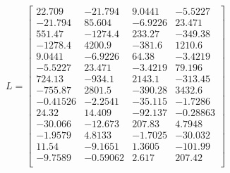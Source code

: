 {\small
\[
L=\begin{bmatrix}
22.709 & -21.794 & 9.0441 & -5.5227 \\
-21.794 & 85.604 & -6.9226 & 23.471 \\
551.47 & -1274.4 & 233.27 & -349.38 \\
-1278.4 & 4200.9 & -381.6 & 1210.6 \\
9.0441 & -6.9226 & 64.38 & -3.4219 \\
-5.5227 & 23.471 & -3.4219 & 79.196 \\
724.13 & -934.1 & 2143.1 & -313.45 \\
-755.87 & 2801.5 & -390.28 & 3432.6 \\
-0.41526 & -2.2541 & -35.115 & -1.7286 \\
24.32 & 14.409 & -92.137 & -0.28863 \\
-30.066 & -12.673 & 207.83 & 4.7948 \\
-1.9579 & 4.8133 & -1.7025 & -30.032 \\
11.54 & -9.1651 & 1.3605 & -101.99 \\
-9.7589 & -0.59062 & 2.617 & 207.42 \\
\end{bmatrix}
\]
}
